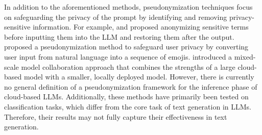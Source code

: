 In addition to the aforementioned methods, pseudonymization techniques focus on safeguarding the privacy of the prompt by identifying and removing privacy-sensitive information.
For example, \citet{kan2023protecting} and \citet{chen2023hide} proposed anonymizing sensitive terms before inputting them into the LLM and restoring them after the output.
\citet{lin2024emojicrypt} proposed a pseudonymization method to safeguard user privacy by converting user input from natural language into a sequence of emojis.
\citet{zhang2024cogenesis} introduced a mixed-scale model collaboration approach that combines the strengths of a large cloud-based model with a smaller, locally deployed model.
However, there is currently no general definition of a pseudonymization framework for the inference phase of cloud-based LLMs.
Additionally, these methods have primarily been tested on classification tasks, which differ from the core task of text generation in LLMs. Therefore, their results may not fully capture their effectiveness in text generation.

%